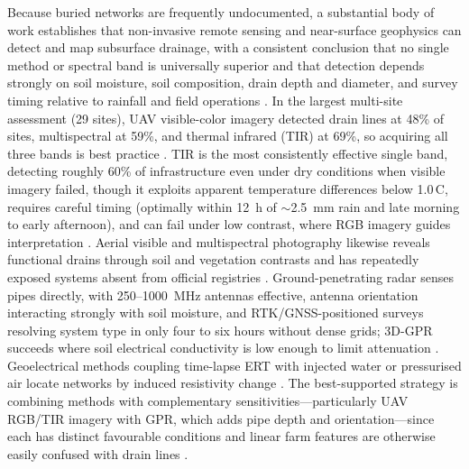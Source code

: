 \documentclass[11pt]{article}
\begin{document}
Because buried networks are frequently undocumented, a substantial body of work
establishes that non-invasive remote sensing and near-surface geophysics can
detect and map subsurface drainage, with a consistent conclusion that no single
method or spectral band is universally superior and that detection depends
strongly on soil moisture, soil composition, drain depth and diameter, and
survey timing relative to rainfall and field operations
\parencite{Carlsen2024,Wienken2024,Koganti2021}. In the largest multi-site
assessment (29 sites), UAV visible-color imagery detected drain lines at 48\%
of sites, multispectral at 59\%, and thermal infrared (TIR) at 69\%, so
acquiring all three bands is best practice \parencite{Allred2020}. TIR is the
most consistently effective single band, detecting roughly 60\% of
infrastructure even under dry conditions when visible imagery failed, though it
exploits apparent temperature differences below 1.0\,\textdegree C, requires
careful timing (optimally within 12~h of $\sim$2.5~mm rain and late morning to
early afternoon), and can fail under low contrast, where RGB imagery guides
interpretation
\parencite{Allred2018,Woo2019,Allred2021,Allred2022,Kratt2020}. Aerial visible
and multispectral photography likewise reveals functional drains through soil
and vegetation contrasts and has repeatedly exposed systems absent from
official registries \parencite{Tlapáková2017}. Ground-penetrating radar senses
pipes directly, with 250--1000~MHz antennas effective, antenna orientation
interacting strongly with soil moisture, and RTK/GNSS-positioned surveys
resolving system type in only four to six hours without dense grids; 3D-GPR
succeeds where soil electrical conductivity is low enough to limit attenuation
\parencite{Allred2005,Allred2013,Allred2018b,Koganti2020}. Geoelectrical
methods coupling time-lapse ERT with injected water or pressurised air locate
networks by induced resistivity change
\parencite{Jouen2018,Henine2021}. The best-supported strategy is combining
methods with complementary sensitivities---particularly UAV RGB/TIR imagery
with GPR, which adds pipe depth and orientation---since each has distinct
favourable conditions and linear farm features are otherwise easily confused
with drain lines \parencite{Koganti2021,Carlsen2024,Wienken2024,Allred2020}.
\end{document}
